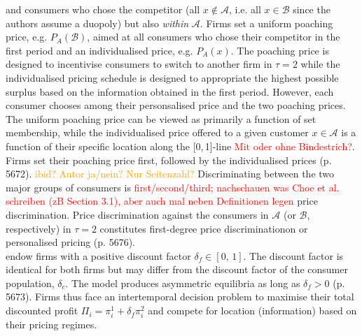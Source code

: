 \documentclass[a4paper, 11 pt, fleqn]{article}
\begin{document}
and consumers who chose the competitor (all $x\notin\mathscr{A}$, i.e. all $x\in\mathscr{B}$ since the authors assume a duopoly) but also
\textit{within} $\mathscr{A}$. Firms set a uniform poaching price, e.g. $P_A(\mathscr{B})$, aimed at all consumers who chose their competitor
in the first period and an individualised price, e.g. $P_A(x)$. The poaching price is designed to incentivise consumers to switch to another
firm in $\tau=2$ while the individualised pricing schedule is designed to appropriate the highest possible surplus based on the information
obtained in the first period.
However, each consumer chooses among their personsalised price and the two poaching prices. The uniform poaching price can be viewed
as primarily a function of set membership, while the individualised price offered to a given customer $x\in\mathscr{A}$ is a function of their
specific location along the [0,\,1]-line \textcolor{red}{Mit oder ohne Bindestrich?}.
Firms set their poaching price first, followed by the individualised prices (p. 5672). \textcolor{orange}{ibid? Autor ja/nein? Nur Seitenzahl?}
Discriminating between the two major groups of consumers is \textcolor{red}{first/second/third; nachschauen was Choe et al. schreiben (zB Section 3.1), aber auch mal neben Definitionen legen}
price discrimination. Price discrimination against the consumers in $\mathscr{A}$ (or $\mathscr{B}$, respectively) in $\tau = 2$ constitutes first-degree price discriminationon or personalised pricing (p. 5676). \\
\citet[p. 5672]{Choe.2018} endow firms with a positive discount factor $\delta_f \in [0,\,1]$. The discount factor is identical for both
firms but may differ from the discount factor of the consumer population, $\delta_c$. The model produces asymmetric equilibria as long as
$\delta_f > 0$ (p. 5673). Firms thus face an intertemporal decision problem to maximise their total discounted profit
$\Pi_i = \pi^1_i + \delta_f\pi^2_i$ and compete for location (information) based on their pricing regimes.
%
\end{document}
